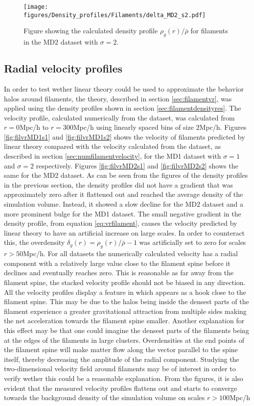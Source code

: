 \begin{figure}[H]
    \texttt{[image: figures/Density\_profiles/Filaments/delta\_MD2\_s2.pdf]}
    \caption{Figure showing the calculated density profile $\rho_g(r)/\bar{\rho}$ for filaments in the MD2 dataset with $\sigma=2$.}
    \label{fig:fildensitytMD2s2}
\end{figure}
\subsection{Radial velocity profiles}
In order to test wether linear theory could be used to approximate the behavior halos around filaments, the theory, described in section \ref{sec:filamentvr}, was applied using the density profiles shown in section \ref{sec:filamentdensityres}. The velocity profile, calculated numerically from the dataset, was calculated from $r=0$Mpc/h to $r=300$Mpc/h using linearly spaced bins of size $2$Mpc/h. Figures \ref{fig:filvrMD1s1} and \ref{fig:filvrMD1s2} shows the velocity of filaments predicted by linear theory compared with the velocity calculated from the dataset, as described in section \ref{sec:numfilamentvelocity}, for the MD1 dataset with $\sigma=1$ and $\sigma=2$ respectively. Figures \ref{fig:filvrMD2s1} and \ref{fig:filvrMD2s2} shows the same for the MD2 dataset. As can be seen from the figures of the density profiles in the previous section, the density profiles did not have a gradient that was approximately zero after it flattened out and reached the average density of the simulation volume. Instead, it showed a slow decline for the MD2 dataset and a more prominent bulge for the MD1 dataset. The small negative gradient in the density profile, from equation \ref{eq:vrfilament}, causes the velocity predicted by linear theory to have an artificial increase on large scales. In order to counteract this, the overdensity $\delta_g(r)=\rho_g(r)/\bar{\rho}-1$ was artificially set to zero for scales $r>50$Mpc/h. For all datasets the numerically calculated velocity has a radial component with a relatively large value close to the filament spine before it declines and eventually reaches zero. This is reasonable as far away from the filament spine, the stacked velocity profile should not be biased in any direction. All the velocity profiles display a feature in which appears as a hook close to the filament spine. This may be due to the halos being inside the densest parts of the filament experience a greater gravitational attraction from multiple sides making the net acceleration towards the filament spine smaller. Another explanation for this effect may be that one could imagine the densest parts of the filaments being at the edges of the filaments in large clusters. Overdensities at the end points of the filament spine will make matter flow along the vector parallel to the spine itself, thereby decreasing the amplitude of the radial component. Studying the two-dimensional velocity field around filaments may be of interest in order to verify wether this could be a reasonable explanation. From the figures, it is also evident that the measured velocity profiles flattens out and starts to converge towards the background density of the simulation volume on scales $r>100$Mpc/h \\\indent
